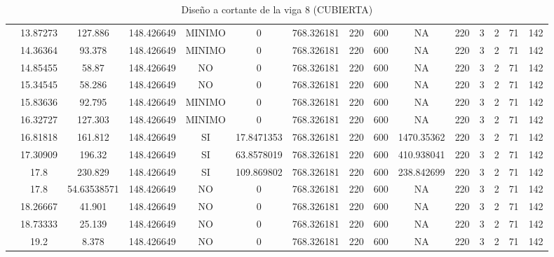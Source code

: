 \begin{table}[H]
{\begin{tabular}{|c|c|c|c|c|c|c|c|c|c|c|c|c|c|c|}
\cline{2-15}    & 13.87273 & 127.886 & 148.426649 & MINIMO & 0   & 768.326181 & 220 & 600 & NA  & 220 & 3   & 2   & 71  & 142 \bigstrut\\
\cline{2-15}    & 14.36364 & 93.378 & 148.426649 & MINIMO & 0   & 768.326181 & 220 & 600 & NA  & 220 & 3   & 2   & 71  & 142 \bigstrut\\
\cline{2-15}    & 14.85455 & 58.87 & 148.426649 & NO  & 0   & 768.326181 & 220 & 600 & NA  & 220 & 3   & 2   & 71  & 142 \bigstrut\\
\cline{2-15}    & 15.34545 & 58.286 & 148.426649 & NO  & 0   & 768.326181 & 220 & 600 & NA  & 220 & 3   & 2   & 71  & 142 \bigstrut\\
\cline{2-15}    & 15.83636 & 92.795 & 148.426649 & MINIMO & 0   & 768.326181 & 220 & 600 & NA  & 220 & 3   & 2   & 71  & 142 \bigstrut\\
\cline{2-15}    & 16.32727 & 127.303 & 148.426649 & MINIMO & 0   & 768.326181 & 220 & 600 & NA  & 220 & 3   & 2   & 71  & 142 \bigstrut\\
\cline{2-15}    & 16.81818 & 161.812 & 148.426649 & SI  & 17.8471353 & 768.326181 & 220 & 600 & 1470.35362 & 220 & 3   & 2   & 71  & 142 \bigstrut\\
\cline{2-15}    & 17.30909 & 196.32 & 148.426649 & SI  & 63.8578019 & 768.326181 & 220 & 600 & 410.938041 & 220 & 3   & 2   & 71  & 142 \bigstrut\\
\cline{2-15}    & 17.8 & 230.829 & 148.426649 & SI  & 109.869802 & 768.326181 & 220 & 600 & 238.842699 & 220 & 3   & 2   & 71  & 142 \bigstrut\\
\cline{2-15}    & 17.8 & 54.63538571 & 148.426649 & NO  & 0   & 768.326181 & 220 & 600 & NA  & 220 & 3   & 2   & 71  & 142 \bigstrut\\
\cline{2-15}    & 18.26667 & 41.901 & 148.426649 & NO  & 0   & 768.326181 & 220 & 600 & NA  & 220 & 3   & 2   & 71  & 142 \bigstrut\\
\cline{2-15}    & 18.73333 & 25.139 & 148.426649 & NO  & 0   & 768.326181 & 220 & 600 & NA  & 220 & 3   & 2   & 71  & 142 \bigstrut\\
\cline{2-15}    & 19.2 & 8.378 & 148.426649 & NO  & 0   & 768.326181 & 220 & 600 & NA  & 220 & 3   & 2   & 71  & 142 \bigstrut\\
\hline
\end{tabular}%



  
 
  }%
    \caption{Diseño a cortante de la viga 8 (CUBIERTA) }
  \label{tab:C VG8 CUB }%
\end{table}%
